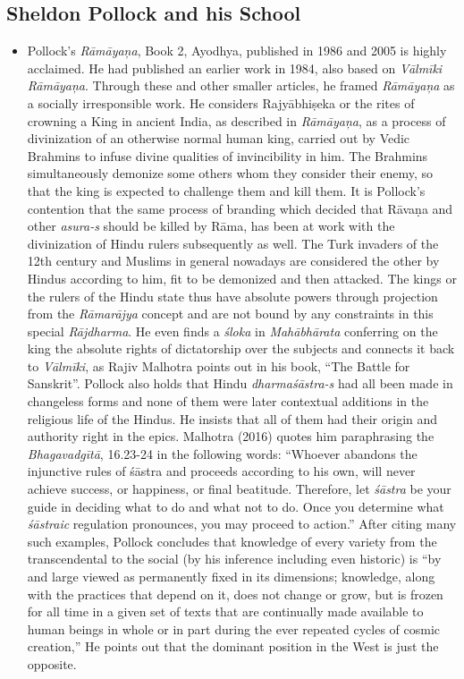 \subsection*{Sheldon Pollock and his School}

\begin{itemize}
\item Pollock’s \textit{Rāmāyaņa}, Book 2, Ayodhya, published in 1986 and 2005 is highly acclaimed. He had published an earlier work in 1984, also based on \textit{Vālmīki Rāmāyaņa}. Through these and other smaller articles, he framed \textit{Rāmāyaņa} as a socially irresponsible work. He considers Rajyābhiṣeka or the rites of crowning a King in ancient India, as described in \textit{Rāmāyaņa}, as a process of divinization of an otherwise normal human king, carried out by Vedic Brahmins to infuse divine qualities of invincibility in him. The Brahmins simultaneously demonize some others whom they consider their enemy, so that the king is expected to challenge them and kill them. It is Pollock’s contention that the same process of branding which decided that Rāvaṇa and other \textit{asura-s} should be killed by Rāma, has been at work with the divinization of Hindu rulers subsequently as well. The Turk invaders of the 12th century and Muslims in general nowadays are considered the other by Hindus according to him, fit to be demonized and then attacked. The kings or the rulers of the Hindu state thus have absolute powers through projection from the \textit{Rāmarājya} concept and are not bound by any constraints in this special \textit{Rājdharma}. He even finds a \textit{śloka} in \textit{Mahābhārata} conferring on the king the absolute rights of dictatorship over the subjects and connects it back to \textit{Vālmīki}, as Rajiv Malhotra points out in his book, “The Battle for Sanskrit”. Pollock also holds that Hindu \textit{dharmaśāstra-s} had all been made in changeless forms and none of them were later contextual additions in the religious life of the Hindus. He insists that all of them had their origin and authority right in the epics. Malhotra (2016) quotes him paraphrasing the \textit{Bhagavadgītā}, 16.23-24 in the following words: “Whoever abandons the injunctive rules of śāstra and proceeds according to his own, will never achieve success, or happiness, or final beatitude. Therefore, let \textit{śāstra} be your guide in deciding what to do and what not to do. Once you determine what \textit{śāstraic} regulation pronounces, you may proceed to action.” After citing many such examples, Pollock concludes that knowledge of every variety from the transcendental to the social (by his inference including even historic) is “by and large viewed as permanently fixed in its dimensions; knowledge, along with the practices that depend on it, does not change or grow, but is frozen for all time in a given set of texts that are continually made available to human beings in whole or in part during the ever repeated cycles of cosmic creation,” He points out that the dominant position in the West is just the opposite.


\end{itemize}
